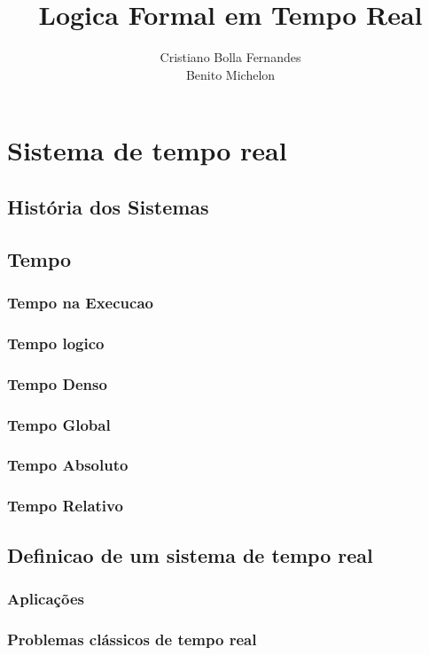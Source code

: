 \documentclass{article}
\author{
	Cristiano Bolla Fernandes \\
	Benito Michelon \\
}
\title {Logica Formal em Tempo Real}
\begin{document}
\maketitle
\newpage


\section{Sistema de tempo real}
	\subsection{História dos Sistemas}
	\subsection{Tempo}
		\subsubsection{Tempo na Execucao}
		\subsubsection{Tempo logico}
		\subsubsection{Tempo Denso}
		\subsubsection{Tempo Global}
		\subsubsection{Tempo Absoluto}
		\subsubsection{Tempo Relativo}
	\subsection{Definicao de um sistema de tempo real}
		\subsubsection{Aplicações}
		\subsubsection{Problemas clássicos de tempo real}
\end{document}

